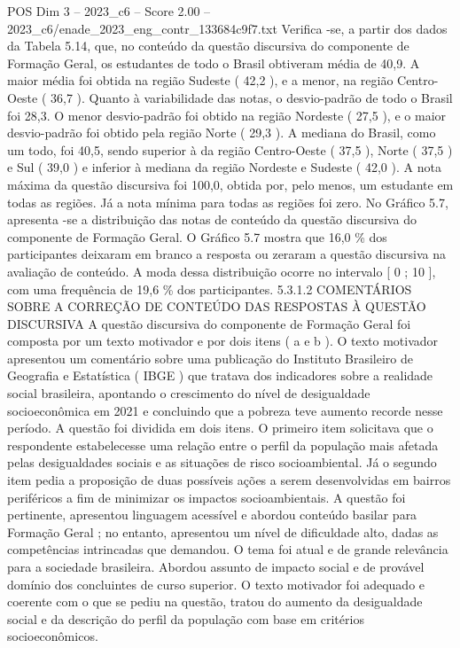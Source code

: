 \begin{textsample}{POS Dim 3 – 2023\_c6 – Score 2.00 – 2023\_c6/enade\_2023\_eng\_contr\_133684c9f7.txt}
Verifica -se, a partir dos dados da Tabela 5.14, que, no conteúdo da questão discursiva do componente de Formação Geral, os estudantes de todo o Brasil obtiveram média de 40,9.
A maior média foi obtida na região Sudeste ( 42,2 ), e a menor, na região Centro-Oeste ( 36,7 ).
Quanto à variabilidade das notas, o desvio-padrão de todo o Brasil foi 28,3.
O menor desvio-padrão foi obtido na região Nordeste ( 27,5 ), e o maior desvio-padrão foi obtido pela região Norte ( 29,3 ).
A mediana do Brasil, como um todo, foi 40,5, sendo superior à da região Centro-Oeste ( 37,5 ), Norte ( 37,5 ) e Sul ( 39,0 ) e inferior à mediana da região Nordeste e Sudeste ( 42,0 ).
A nota máxima da questão discursiva foi 100,0, obtida por, pelo menos, um estudante em todas as regiões.
Já a nota mínima para todas as regiões foi zero.
No Gráfico 5.7, apresenta -se a distribuição das notas de conteúdo da questão discursiva do componente de Formação Geral.
O Gráfico 5.7 mostra que 16,0 \% dos participantes deixaram em branco a resposta ou zeraram a questão discursiva na avaliação de conteúdo.
A moda dessa distribuição ocorre no intervalo [ 0 ; 10 ], com uma frequência de 19,6 \% dos participantes. 5.3.1.2 COMENTÁRIOS SOBRE A CORREÇÃO DE CONTEÚDO DAS RESPOSTAS À QUESTÃO DISCURSIVA A questão discursiva do componente de Formação Geral foi composta por um texto motivador e por dois itens ( a e b ).
O texto motivador apresentou um comentário sobre uma publicação do Instituto Brasileiro de Geografia e Estatística ( IBGE ) que tratava dos indicadores sobre a realidade social brasileira, apontando o crescimento do nível de desigualdade socioeconômica em 2021 e concluindo que a pobreza teve aumento recorde nesse período.
A questão foi dividida em dois itens.
O primeiro item solicitava que o respondente estabelecesse uma relação entre o perfil da população mais afetada pelas desigualdades sociais e as situações de risco socioambiental.
Já o segundo item pedia a proposição de duas possíveis ações a serem desenvolvidas em bairros periféricos a fim de minimizar os impactos socioambientais.
A questão foi pertinente, apresentou linguagem acessível e abordou conteúdo basilar para Formação Geral ; no entanto, apresentou um nível de dificuldade alto, dadas as competências intrincadas que demandou.
O tema foi atual e de grande relevância para a sociedade brasileira.
Abordou assunto de impacto social e de provável domínio dos concluintes de curso superior.
O texto motivador foi adequado e coerente com o que se pediu na questão, tratou do aumento da desigualdade social e da descrição do perfil da população com base em critérios socioeconômicos.

\end{textsample}
